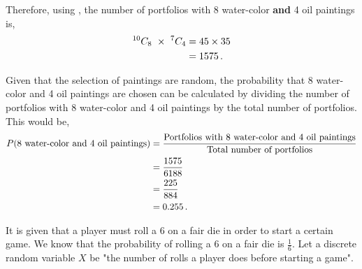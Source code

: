 \begin{subquestions}
\begin{subsubquestions}
Therefore, using , the number of portfolios with 8 water-color \textbf{and} 4 oil paintings is,
\begin{align}
	^{10}C_{8} ~\times ~ ^7C_{4} & = 45 \times 35 \nonumber \\
	                            & = 1575 \,.
\end{align}


\subsubquestion

Given that the selection of paintings are random, the probability that 8 water-color and 4 oil paintings are chosen can be calculated by dividing the number of portfolios with 8 water-color and 4 oil paintings by the total number of portfolios. This would be,
\begin{align}
	P(\text{8 water-color and 4 oil paintings}) & = \frac{\text{Portfolios with 8 water-color and 4 oil paintings}}{\text{Total number of portfolios}} \nonumber \\
	                                            & = \frac{1575}{6188} \nonumber \\
	                                            & = \frac{225}{884} \nonumber \\
	                                            & = 0.255 \,.
\end{align}

\end{subsubquestions}
	

\subquestion

It is given that a player must roll a 6 on a fair die in order to start a certain game. We know that the probability of rolling a 6 on a fair die is $\frac{1}{6}$. Let a discrete random variable $X$ be "the number of rolls a player does before starting a game".
\end{subquestions}